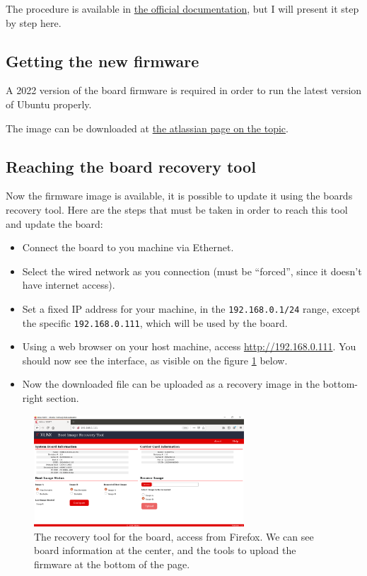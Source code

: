 \documentclass[10pt]{article}
\begin{document}
The procedure is available in \href{https://docs.xilinx.com/r/en-US/ug1089-kv260-starter-kit/Firmware-Update}{the official documentation},
but I will present it step by step here.

\subsection{Getting the new firmware}
\label{sec:getting-new-firmware}
A 2022 version of the board firmware is required in order to run the latest version of Ubuntu properly.

The image can be downloaded at \href{https://xilinx-wiki.atlassian.net/wiki/spaces/A/pages/1641152513/Kria+K26+SOM#Boot-FW-update-with-xmutil}{the atlassian page on the topic}.

\subsection{Reaching the board recovery tool}
\label{sec:reach-board-recov}
Now the firmware image is available, it is possible to update it using the boards recovery tool.
Here are the steps that must be taken in order to reach this tool and update the board:

\begin{itemize}
\item Connect the board to you machine via Ethernet.
\item Select the wired network as you connection (must be ``forced'', since it doesn't have internet access).
\item Set a fixed IP address for your machine, in the \verb|192.168.0.1/24| range, except the specific \verb|192.168.0.111|, which will be used by the board.
\item Using a web browser on your host machine, access \url{http://192.168.0.111}. You should now see the interface, as visible on the figure \ref{fig:recovery} below.
\item Now the downloaded file can be uploaded as a recovery image in the bottom-right section.
\end{itemize}

\begin{figure}[H]
  \centering
  \includegraphics[width=0.7\textwidth]{./img/recovery.png}
  \caption{The recovery tool for the board, access from Firefox. We can see board information at the center, and the tools to upload the firmware at the bottom of the page.}
  \label{fig:recovery}
\end{figure}
\end{document}
